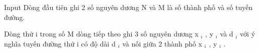 Input
Dòng đầu tiên ghi 2 số nguyên dương N và M là số thành phố và số tuyến đường.  

   Dòng thứ i trong số M dòng tiếp theo ghi 3 số nguyên dương x   $_    i   $   , y   $_    i   $   và d   $_    i   $   với ý nghĩa tuyến đường thứ i có độ dài d   $_    i   $   và nối giữa 2 thành phố x   $_    i   $   , y   $_    i   $   .
